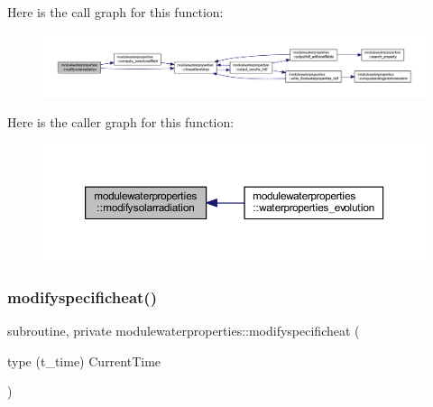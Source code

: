 Here is the call graph for this function\+:\nopagebreak
\begin{figure}[H]
\begin{center}
\leavevmode
\includegraphics[width=350pt]{namespacemodulewaterproperties_a53a84226a2a46ab704fec5883bc4639a_cgraph}
\end{center}
\end{figure}
Here is the caller graph for this function\+:\nopagebreak
\begin{figure}[H]
\begin{center}
\leavevmode
\includegraphics[width=350pt]{namespacemodulewaterproperties_a53a84226a2a46ab704fec5883bc4639a_icgraph}
\end{center}
\end{figure}
\mbox{\label{namespacemodulewaterproperties_ac377b27826c6ced4a835d6e47384f917}} 
\subsubsection{\texorpdfstring{modifyspecificheat()}{modifyspecificheat()}}
{\footnotesize\ttfamily subroutine, private modulewaterproperties\+::modifyspecificheat (\begin{DoxyParamCaption}\item[{type (t\+\_\+time)}]{Current\+Time }\end{DoxyParamCaption})\hspace{0.3cm}{\ttfamily [private]}}

